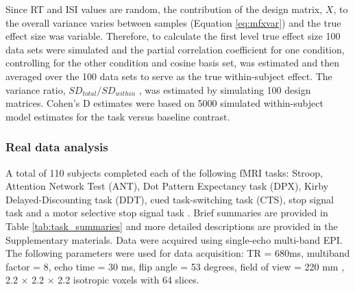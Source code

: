 \documentclass[titlepage,12pt] {article}
\begin{document}
Since RT and ISI values are random, the contribution of the design matrix, $X$, to the overall variance varies between samples (Equation \ref{eq:mfxvar}) and the true effect size was variable.  Therefore, to calculate the first level true effect size 100 data sets were simulated and the partial correlation coefficient for one condition, controlling for the other condition and cosine basis set, was estimated and then averaged over the 100 data sets to serve as the true within-subject effect. The variance ratio, $SD_{total}/SD_{within}$ , was estimated by simulating 100 design matrices.  Cohen's D estimates were based on 5000 simulated within-subject model estimates for the task versus baseline contrast.

\subsubsection*{Real data analysis}

A total of 110 subjects completed each of the following fMRI tasks: Stroop, Attention Network Test (ANT), Dot Pattern Expectancy task (DPX), Kirby Delayed-Discounting task (DDT), cued task-switching task (CTS), stop signal task and a motor selective stop signal task \citep{fanTestingEfficiencyIndependence2002, macdonaldBuildingClinicallyRelevant2008, kirby2009, ruge2005, logan1984, bissett2014}.  Brief summaries are provided in Table \ref{tab:task_summaries} and more detailed descriptions are provided in the Supplementary materials.  Data were acquired using single-echo multi-band EPI. The following parameters were used for data acquisition: TR = 680ms, multiband factor = 8, echo time = 30 ms, flip angle = 53 degrees, field of view = 220 mm , 2.2 $\times$ 2.2 $\times$ 2.2 isotropic voxels with 64 slices.
\end{document}
